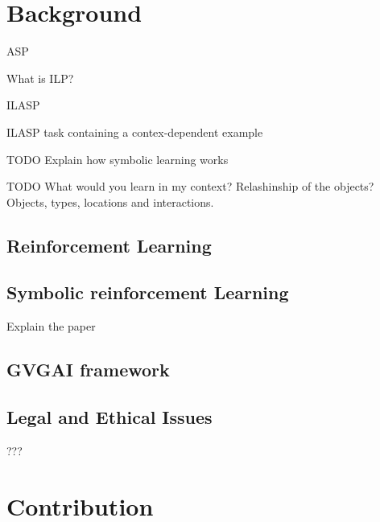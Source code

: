 \documentclass[12pt,twoside]{report}
\begin{document}
\chapter{Background}

ASP

What is ILP?

ILASP


ILASP task containing a contex-dependent example



TODO Explain how symbolic learning works

TODO What would you learn in my context? Relashinship of the objects?
Objects, types, locations and interactions.


\section{Reinforcement Learning}


\section{Symbolic reinforcement Learning}


Explain the paper


\section{GVGAI framework}

\section{Legal and Ethical Issues}
???


\chapter{Contribution}


%
%



\end{document}
